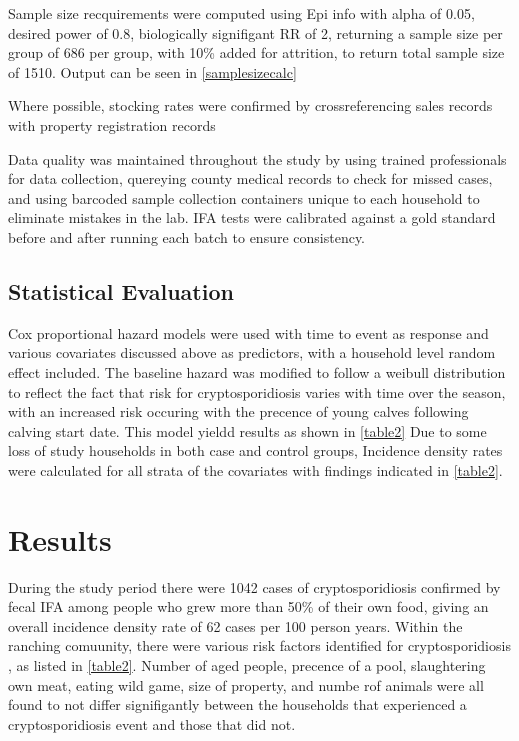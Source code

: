 \documentclass[12pt]{article}
\begin{document}
		Sample size recquirements were computed using Epi info with alpha of 0.05, desired power of 0.8, biologically signifigant RR of 2, returning a sample size per group of 686 per group, with 10\% added for attrition, to return total sample size of 1510.
		Output can be seen in \ref{samplesizecalc}

		Where possible, stocking rates were confirmed by crossreferencing sales records with property registration records
		

		Data quality was maintained throughout the study by using trained professionals for data collection, quereying county medical records to check for missed cases, and using barcoded sample collection containers unique to each household to eliminate mistakes in the lab.
		IFA tests were calibrated against a gold standard before and after running each batch to ensure consistency.

	\subsection{Statistical Evaluation}
		Cox proportional hazard models were used with time to event as response and various covariates discussed above as predictors, with a household level random effect included.
		The baseline hazard was modified to follow a weibull distribution to reflect the fact that risk for cryptosporidiosis varies with time over the season, with an increased risk occuring with the precence of young calves following calving start date. 
		This model yieldd results as shown in \ref{table2}
		Due to some loss of study households in both case and control groups, Incidence density rates were calculated for all strata of the covariates with findings indicated in \ref{table2}.



	\section{Results}
		During the study period there were 1042 cases of cryptosporidiosis confirmed by fecal IFA among people who grew more than 50\% of their own food, giving an overall incidence density rate of 62 cases per 100 person years.
		Within the ranching comuunity, there were various risk factors identified for cryptosporidiosis , as listed in \ref{table2}. 
		Number of aged people, precence of a pool, slaughtering own meat, eating wild game, size of property, and numbe rof animals were all found to not differ signifigantly between the households that experienced a cryptosporidiosis event and those that did not. 
\end{document}
